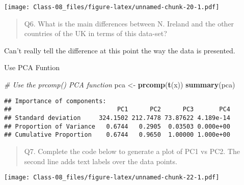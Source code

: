 \documentclass[]{article}
\newenvironment{Shaded}{\begin{snugshade}}{\end{snugshade}}
\newcommand{\CommentTok}[1]{\textcolor[rgb]{0.56,0.35,0.01}{\textit{#1}}}
\newcommand{\DataTypeTok}[1]{\textcolor[rgb]{0.13,0.29,0.53}{#1}}
\newcommand{\DecValTok}[1]{\textcolor[rgb]{0.00,0.00,0.81}{#1}}
\newcommand{\KeywordTok}[1]{\textcolor[rgb]{0.13,0.29,0.53}{\textbf{#1}}}
\newcommand{\NormalTok}[1]{#1}
\newcommand{\OperatorTok}[1]{\textcolor[rgb]{0.81,0.36,0.00}{\textbf{#1}}}
\newcommand{\StringTok}[1]{\textcolor[rgb]{0.31,0.60,0.02}{#1}}
\begin{document}
\texttt{[image: Class-08\_files/figure-latex/unnamed-chunk-20-1.pdf]}

\begin{quote}
Q6. What is the main differences between N. Ireland and the other
countries of the UK in terms of this data-set?
\end{quote}

Can't really tell the difference at this point the way the data is
presented.

Use PCA Funtion

\begin{Shaded}
\begin{Highlighting}[]
\CommentTok{# Use the prcomp() PCA function}
\NormalTok{pca <-}\StringTok{ }\KeywordTok{prcomp}\NormalTok{(}\KeywordTok{t}\NormalTok{(x))}
\KeywordTok{summary}\NormalTok{(pca)}
\end{Highlighting}
\end{Shaded}

\begin{verbatim}
## Importance of components:
##                             PC1      PC2      PC3       PC4
## Standard deviation     324.1502 212.7478 73.87622 4.189e-14
## Proportion of Variance   0.6744   0.2905  0.03503 0.000e+00
## Cumulative Proportion    0.6744   0.9650  1.00000 1.000e+00
\end{verbatim}

\begin{quote}
Q7. Complete the code below to generate a plot of PC1 vs PC2. The second
line adds text labels over the data points.
\end{quote}

\begin{Shaded}
\end{Shaded}

\texttt{[image: Class-08\_files/figure-latex/unnamed-chunk-22-1.pdf]}
\end{document}
